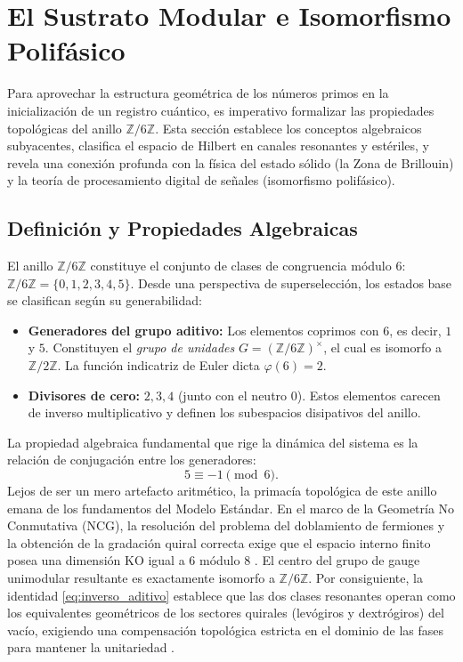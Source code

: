 \documentclass[12pt,a4paper]{article}
\theoremstyle{plain}
\theoremstyle{definition}
\theoremstyle{remark}
\begin{document}
\section{El Sustrato Modular e Isomorfismo Polifásico}
\label{sec:sustrato_modular}

Para aprovechar la estructura geométrica de los números primos en la inicialización de un registro cuántico, es imperativo formalizar las propiedades topológicas del anillo $\mathbb{Z}/6\mathbb{Z}$. Esta sección establece los conceptos algebraicos subyacentes, clasifica el espacio de Hilbert en canales resonantes y estériles, y revela una conexión profunda con la física del estado sólido (la Zona de Brillouin) y la teoría de procesamiento digital de señales (isomorfismo polifásico).

\subsection{Definición y Propiedades Algebraicas}

El anillo $\mathbb{Z}/6\mathbb{Z}$ constituye el conjunto de clases de congruencia módulo 6: $\mathbb{Z}/6\mathbb{Z} = \{0,1,2,3,4,5\}$. Desde una perspectiva de superselección, los estados base se clasifican según su generabilidad:
\begin{itemize}
    \item \textbf{Generadores del grupo aditivo:} Los elementos coprimos con 6, es decir, $1$ y $5$. Constituyen el \textit{grupo de unidades} $G = (\mathbb{Z}/6\mathbb{Z})^{\times}$, el cual es isomorfo a $\mathbb{Z}/2\mathbb{Z}$. La función indicatriz de Euler dicta $\varphi(6)=2$.
    \item \textbf{Divisores de cero:} $2,3,4$ (junto con el neutro $0$). Estos elementos carecen de inverso multiplicativo y definen los subespacios disipativos del anillo.
\end{itemize}

La propiedad algebraica fundamental que rige la dinámica del sistema es la relación de conjugación entre los generadores:
\begin{equation}
5 \equiv -1 \pmod{6}.
\label{eq:inverso_aditivo}
\end{equation}
Lejos de ser un mero artefacto aritmético, la primacía topológica de este anillo emana de los fundamentos del Modelo Estándar. En el marco de la Geometría No Conmutativa (NCG), la resolución del problema del doblamiento de fermiones y la obtención de la gradación quiral correcta exige que el espacio interno finito posea una dimensión KO igual a 6 módulo 8 \cite{Connes2008}. El centro del grupo de gauge unimodular resultante es exactamente isomorfo a $\mathbb{Z}/6\mathbb{Z}$. Por consiguiente, la identidad \eqref{eq:inverso_aditivo} establece que las dos clases resonantes operan como los equivalentes geométricos de los sectores quirales (levógiros y dextrógiros) del vacío, exigiendo una compensación topológica estricta en el dominio de las fases para mantener la unitariedad \cite{PeinadorRiemann}.
\end{document}
